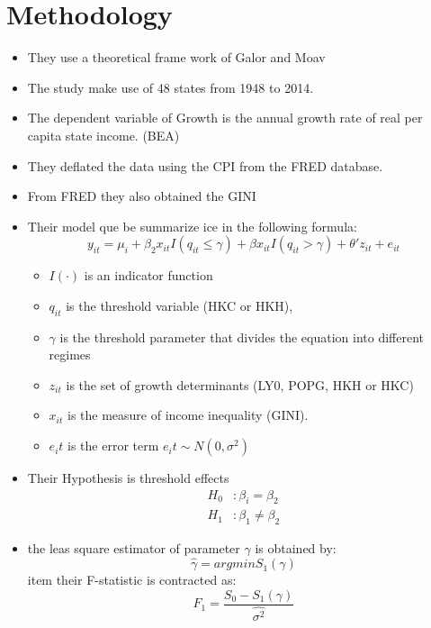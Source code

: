 \documentclass[10pt, oneside]{article}
\begin{document}
\section{Methodology}
\begin{itemize}
	\item They use a theoretical frame work of Galor and Moav \cite{moav2004physical}
	\item The study make use of 48 states from 1948 to 2014.
	\item The dependent variable of Growth is the annual growth rate of real per capita state income. (BEA)
	\item They deflated the data using the CPI from the FRED database.
	\item From FRED they also obtained the GINI
	\item Their model que be summarize ice in the following formula:
	      \begin{equation}
		      y_{it} = \mu_i + \beta_2 x_{it} I(q_{it} \le \gamma) + \beta x_{it} I(q_{it} > \gamma) + \theta' z_{it} + e_{it}
	      \end{equation}
	      \begin{itemize}
		      \item $I(\cdot)$ is an indicator function
		      \item $q_{it}$ is the threshold variable (HKC or HKH),
		      \item $\gamma$ is the threshold parameter that divides the equation into different regimes
		      \item $z_{it}$ is the set of growth determinants (LY0, POPG, HKH or HKC)
		      \item $x_{it}$ is the measure of income inequality (GINI).
		      \item $e_it$ is the error term $e_it \sim N(0,\sigma^2)$
	      \end{itemize}
	\item Their Hypothesis is threshold effects
	      \[
		      \begin{split}
			      H_0 & : \beta_i = \beta_2    \\
			      H_1 & : \beta_1 \neq \beta_2
		      \end{split}
	      \]
	\item the leas square estimator of parameter $\gamma$ is obtained by:
	      \begin{equation}
		      \hat{\gamma} = argmin S_1(\gamma)
	      \end{equation}
	      item their F-statistic is contracted as:
	      \begin{equation}
		      F_1= \frac{S_0 - S_1(\gamma)}{\hat{\sigma^2}}
	      \end{equation}
\end{itemize}
\end{document}
